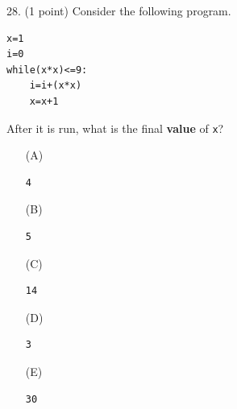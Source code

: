 \documentclass{article}
\begin{document}
\noindent
\begin{minipage}{\textwidth}
28. (1 point)
Consider the following program.
\begin{verbatim}
x=1
i=0
while(x*x)<=9:
    i=i+(x*x)
    x=x+1
\end{verbatim}
After it is run, what is the final \textbf{value} of \texttt{x}?

\begin{enumerate}
\item[(A)]
\begin{verbatim}4\end{verbatim}

\item[(B)]
\begin{verbatim}5\end{verbatim}

\item[(C)]
\begin{verbatim}14\end{verbatim}

\item[(D)]
\begin{verbatim}3\end{verbatim}

\item[(E)]
\begin{verbatim}30\end{verbatim}

\end{enumerate}
\end{minipage}
\vspace{2em}
\filbreak\vfil{}\vfilneg
\end{document}
